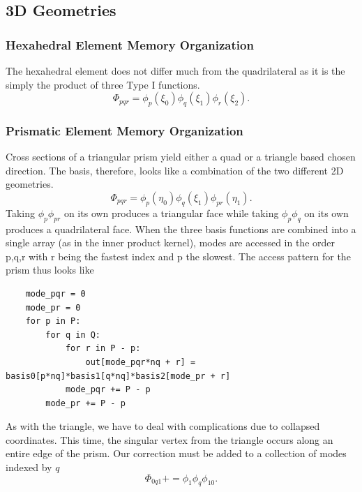 \subsection{3D Geometries}

\subsubsection{Hexahedral Element Memory Organization}
The hexahedral element does not differ much from the quadrilateral as it is the simply the product of three Type I functions.
\[
    \Phi_{pqr} = \phi_p(\xi_0) \phi_q(\xi_1) \phi_r(\xi_2).
\]

\subsubsection{Prismatic Element Memory Organization}
Cross sections of a triangular prism yield either a quad or a triangle based chosen direction. The basis, therefore, looks like a combination of the two different 2D geometries.
\[
    \Phi_{pqr} = \phi_p(\eta_0)\phi_q(\xi_1)\phi_{pr}(\eta_1).
\]
Taking $\phi_p \phi_{pr}$ on its own produces a triangular face while taking $\phi_p \phi_q$ on its own produces a quadrilateral face. When the three basis functions are combined into a single array (as in the inner product kernel), modes are accessed in the order p,q,r with r being the fastest index and p the slowest. The access pattern for the prism thus looks like
\begin{lstlisting}
    mode_pqr = 0
    mode_pr = 0
    for p in P:
        for q in Q:
            for r in P - p:
                out[mode_pqr*nq + r] = basis0[p*nq]*basis1[q*nq]*basis2[mode_pr + r]
            mode_pqr += P - p
        mode_pr += P - p
\end{lstlisting}

As with the triangle, we have to deal with complications due to collapsed coordinates. This time, the singular vertex from the triangle occurs along an entire edge of the prism. Our correction must be added to a collection of modes indexed by $q$
\[
    \Phi_{0q1} += \phi_1 \phi_q \phi_{10}.
\]

